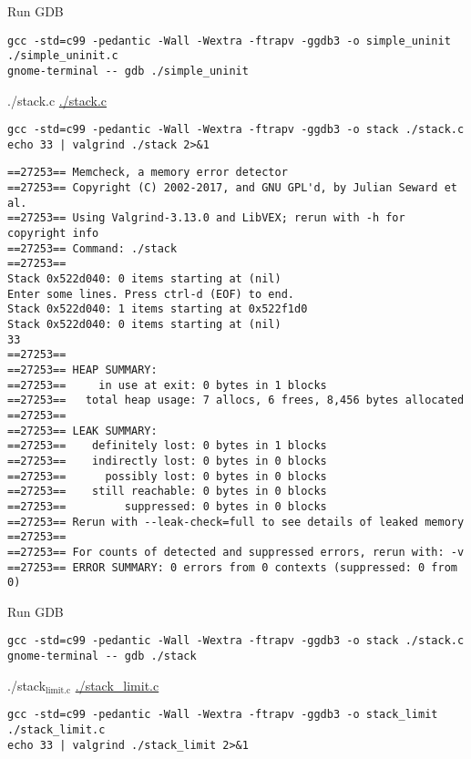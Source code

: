 \documentclass[11pt]{article}
\begin{document}
Run GDB
\begin{verbatim}
gcc -std=c99 -pedantic -Wall -Wextra -ftrapv -ggdb3 -o simple_uninit ./simple_uninit.c
gnome-terminal -- gdb ./simple_uninit
\end{verbatim}

\item ./stack.c
\label{sec:orga98d6f7}
\url{./stack.c}

\begin{verbatim}
gcc -std=c99 -pedantic -Wall -Wextra -ftrapv -ggdb3 -o stack ./stack.c
echo 33 | valgrind ./stack 2>&1
\end{verbatim}

\begin{verbatim}
==27253== Memcheck, a memory error detector
==27253== Copyright (C) 2002-2017, and GNU GPL'd, by Julian Seward et al.
==27253== Using Valgrind-3.13.0 and LibVEX; rerun with -h for copyright info
==27253== Command: ./stack
==27253== 
Stack 0x522d040: 0 items starting at (nil)
Enter some lines. Press ctrl-d (EOF) to end.
Stack 0x522d040: 1 items starting at 0x522f1d0
Stack 0x522d040: 0 items starting at (nil)
33
==27253== 
==27253== HEAP SUMMARY:
==27253==     in use at exit: 0 bytes in 1 blocks
==27253==   total heap usage: 7 allocs, 6 frees, 8,456 bytes allocated
==27253== 
==27253== LEAK SUMMARY:
==27253==    definitely lost: 0 bytes in 1 blocks
==27253==    indirectly lost: 0 bytes in 0 blocks
==27253==      possibly lost: 0 bytes in 0 blocks
==27253==    still reachable: 0 bytes in 0 blocks
==27253==         suppressed: 0 bytes in 0 blocks
==27253== Rerun with --leak-check=full to see details of leaked memory
==27253== 
==27253== For counts of detected and suppressed errors, rerun with: -v
==27253== ERROR SUMMARY: 0 errors from 0 contexts (suppressed: 0 from 0)
\end{verbatim}

Run GDB
\begin{verbatim}
gcc -std=c99 -pedantic -Wall -Wextra -ftrapv -ggdb3 -o stack ./stack.c
gnome-terminal -- gdb ./stack
\end{verbatim}

\item ./stack\(_{\text{limit.c}}\)
\label{sec:org0531140}
\url{./stack\_limit.c}

\begin{verbatim}
gcc -std=c99 -pedantic -Wall -Wextra -ftrapv -ggdb3 -o stack_limit ./stack_limit.c
echo 33 | valgrind ./stack_limit 2>&1
\end{verbatim}
\end{document}
